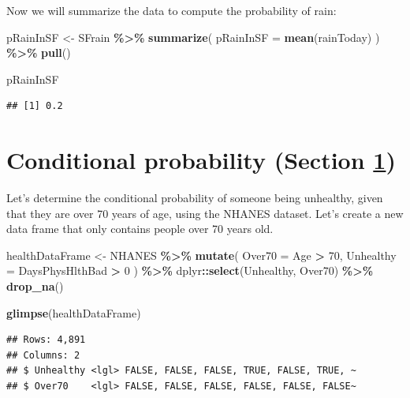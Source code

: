\documentclass[
  12pt,
]{book}
\newenvironment{Shaded}{\begin{snugshade}}{\end{snugshade}}
\newcommand{\AttributeTok}[1]{\textcolor[rgb]{0.13,0.29,0.53}{#1}}
\newcommand{\DecValTok}[1]{\textcolor[rgb]{0.00,0.00,0.81}{#1}}
\newcommand{\FunctionTok}[1]{\textcolor[rgb]{0.13,0.29,0.53}{\textbf{#1}}}
\newcommand{\NormalTok}[1]{#1}
\newcommand{\OtherTok}[1]{\textcolor[rgb]{0.56,0.35,0.01}{#1}}
\newcommand{\SpecialCharTok}[1]{\textcolor[rgb]{0.81,0.36,0.00}{\textbf{#1}}}
\begin{document}
Now we will summarize the data to compute the probability of rain:

\begin{Shaded}
\begin{Highlighting}[]
\NormalTok{pRainInSF }\OtherTok{\textless{}{-}} 
\NormalTok{  SFrain }\SpecialCharTok{\%\textgreater{}\%}
  \FunctionTok{summarize}\NormalTok{(}
    \AttributeTok{pRainInSF =} \FunctionTok{mean}\NormalTok{(rainToday)}
\NormalTok{  ) }\SpecialCharTok{\%\textgreater{}\%}
  \FunctionTok{pull}\NormalTok{()}

\NormalTok{pRainInSF}
\end{Highlighting}
\end{Shaded}

\begin{verbatim}
## [1] 0.2
\end{verbatim}

\hypertarget{conditional-probability}{%
\section{Conditional probability (Section \ref{conditional-probability})}\label{conditional-probability}}

Let's determine the conditional probability of someone being unhealthy, given that they are over 70 years of age, using the NHANES dataset. Let's create a new data frame that only contains people over 70 years old.

\begin{Shaded}
\begin{Highlighting}[]
\NormalTok{healthDataFrame }\OtherTok{\textless{}{-}}
\NormalTok{  NHANES }\SpecialCharTok{\%\textgreater{}\%}
  \FunctionTok{mutate}\NormalTok{(}
    \AttributeTok{Over70 =}\NormalTok{ Age }\SpecialCharTok{\textgreater{}} \DecValTok{70}\NormalTok{,}
    \AttributeTok{Unhealthy =}\NormalTok{ DaysPhysHlthBad }\SpecialCharTok{\textgreater{}} \DecValTok{0}
\NormalTok{  ) }\SpecialCharTok{\%\textgreater{}\%}
\NormalTok{  dplyr}\SpecialCharTok{::}\FunctionTok{select}\NormalTok{(Unhealthy, Over70) }\SpecialCharTok{\%\textgreater{}\%}
  \FunctionTok{drop\_na}\NormalTok{()}

\FunctionTok{glimpse}\NormalTok{(healthDataFrame)}
\end{Highlighting}
\end{Shaded}

\begin{verbatim}
## Rows: 4,891
## Columns: 2
## $ Unhealthy <lgl> FALSE, FALSE, FALSE, TRUE, FALSE, TRUE, ~
## $ Over70    <lgl> FALSE, FALSE, FALSE, FALSE, FALSE, FALSE~
\end{verbatim}
\end{document}
